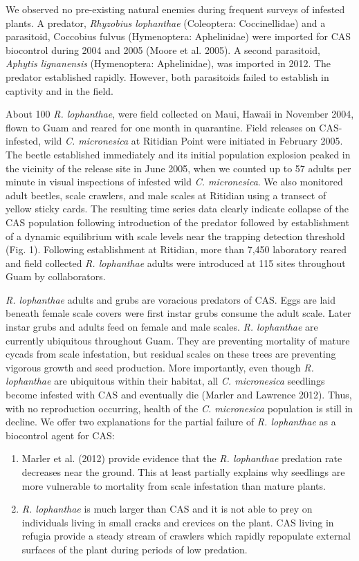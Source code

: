 \documentclass[12pt,oneside,english]{scrbook}
\begin{document}
We observed no pre-existing natural enemies during frequent surveys of infested
plants. A predator, \textit{Rhyzobius lophanthae} (Coleoptera: Coccinellidae) and a parasitoid,
Coccobius fulvus (Hymenoptera: Aphelinidae) were imported for CAS biocontrol during
2004 and 2005 (Moore et al. 2005). A second parasitoid, \textit{Aphytis lignanensis}
(Hymenoptera: Aphelinidae), was imported in 2012. The predator established rapidly.
However, both parasitoids failed to establish in captivity and in the field.

About 100 \textit{R. lophanthae}, were field collected on Maui, Hawaii in November 2004,
flown to Guam and reared for one month in quarantine. Field releases on CAS-
infested, wild \textit{C. micronesica} at Ritidian Point were initiated in February 2005. The
beetle established immediately and its initial population explosion peaked in the vicinity
of the release site in June 2005, when we counted up to 57 adults per minute in visual
inspections of infested wild \textit{C. micronesica}. We also monitored adult beetles, scale
crawlers, and male scales at Ritidian using a transect of yellow sticky cards. The resulting time series data clearly indicate collapse of the CAS population following
introduction of the predator followed by establishment of a dynamic equilibrium with
scale levels near the trapping detection threshold (Fig. 1). Following establishment at
Ritidian, more than 7,450 laboratory reared and field collected \textit{R. lophanthae} adults
were introduced at 115 sites throughout Guam by collaborators.

\textit{R. lophanthae} adults and grubs are voracious predators of CAS. Eggs are laid beneath
female scale covers were first instar grubs consume the adult scale. Later instar grubs
and adults feed on female and male scales. \textit{R. lophanthae} are currently ubiquitous
throughout Guam. They are preventing mortality of mature cycads from scale
infestation, but residual scales on these trees are preventing vigorous growth and seed
production. More importantly, even though \textit{R. lophanthae} are ubiquitous within their
habitat, all \textit{C. micronesica} seedlings become infested with CAS and eventually die
(Marler and Lawrence 2012). Thus, with no reproduction occurring, health of the \textit{C.
micronesica} population is still in decline. We offer two explanations for the partial failure
of \textit{R. lophanthae} as a biocontrol agent for CAS:
\begin{enumerate}
\item Marler et al. (2012) provide evidence that the \textit{R. lophanthae} predation rate
decreases near the ground. This at least partially explains why seedlings are
more vulnerable to mortality from scale infestation than mature plants.
\item \textit{R. lophanthae} is much larger than CAS and it is not able to prey on individuals
living in small cracks and crevices on the plant. CAS living in refugia provide a
steady stream of crawlers which rapidly repopulate external surfaces of the
plant during periods of low predation.
\end{enumerate}
\end{document}
